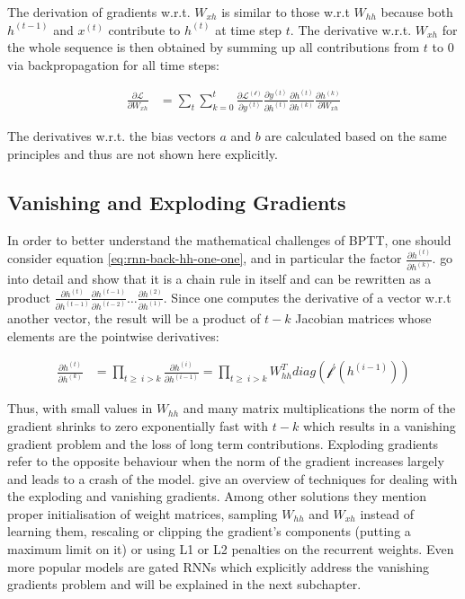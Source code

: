 \documentclass[]{krantz}
\begin{document}
The derivation of gradients w.r.t. \(W_{xh}\) is similar to those w.r.t \(W_{hh}\) because both \(h^{(t-1)}\) and \(x^{(t)}\) contribute to \(h^{(t)}\) at time step \(t\). The derivative w.r.t. \(W_{xh}\) for the whole sequence is then obtained by summing up all contributions from \(t\) to \(0\) via backpropagation for all time steps:

\begin{align}
\frac{\partial \mathcal{L}}{\partial W_{xh}}
& = \sum_{t} \sum_{k=0}^{t} \frac{\partial \mathcal{L^{(t)}}}{\partial y^{(t)}} \frac{\partial y^{(t)}}{\partial h^{(t)}} \frac{\partial h^{(t)}}{\partial h^{(k)}} \frac{\partial h^{(k)}}{\partial W_{xh}} \label{eq:rnn-back-xh-all}
\end{align}

The derivatives w.r.t. the bias vectors \(a\) and \(b\) are calculated based on the same principles and thus are not shown here explicitly.

\hypertarget{vanishing-and-exploding-gradients}{%
\subsection{Vanishing and Exploding Gradients}\label{vanishing-and-exploding-gradients}}

In order to better understand the mathematical challenges of BPTT, one should consider equation \eqref{eq:rnn-back-hh-one-one}, and in particular the factor \(\frac{\partial h^{(t)}}{\partial h^{(k)}}\). \citet{pascanu2013difficulty} go into detail and show that it is a chain rule in itself and can be rewritten as a product \(\frac{\partial h^{(t)}}{\partial h^{(t-1)}} \frac{\partial h^{(t-1)}}{\partial h^{(t-2)}} \ldots \frac{\partial h^{(2)}}{\partial h^{(1)}}\). Since one computes the derivative of a vector w.r.t another vector, the result will be a product of \(t-k\) Jacobian matrices whose elements are the pointwise derivatives:

\begin{align}
\frac{\partial h^{(t)}}{\partial h^{(k)}}
& = \prod_{t\geq\ i>k}^{} \frac{\partial h^{(i)}}{\partial h^{(i-1)}}
= \prod_{t\geq\ i>k}^{} W_{hh}^{T}diag(\mathcal{f}^{'}(h^{(i-1)}))  \label{eq:rnn-back-vanishing} 
\end{align}

Thus, with small values in \(W_{hh}\) and many matrix multiplications the norm of the gradient shrinks to zero exponentially fast with \(t-k\) which results in a vanishing gradient problem and the loss of long term contributions. Exploding gradients refer to the opposite behaviour when the norm of the gradient increases largely and leads to a crash of the model. \citet{pascanu2013difficulty} give an overview of techniques for dealing with the exploding and vanishing gradients. Among other solutions they mention proper initialisation of weight matrices, sampling \(W_{hh}\) and \(W_{xh}\) instead of learning them, rescaling or clipping the gradient's components (putting a maximum limit on it) or using L1 or L2 penalties on the recurrent weights. Even more popular models are gated RNNs which explicitly address the vanishing gradients problem and will be explained in the next subchapter.
\end{document}
